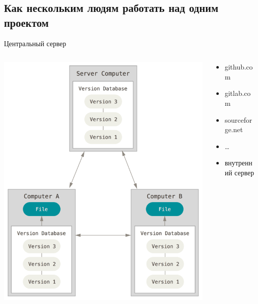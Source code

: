 \documentclass[presentation]{beamer}
\begin{document}
\subsection{Как нескольким людям работать над одним проектом}
\label{sec:orgd2f232c}
\begin{frame}[label={sec:orge85342b}]{Центральный сервер}
\begin{columns}
\begin{column}{0.65\columnwidth}
\begin{center}
\includegraphics[height=0.8\textheight]{./01_vcs_00_distributed_vcs.png}
\end{center}
\end{column}

\begin{column}{0.35\columnwidth}
\begin{itemize}
\item github.com
\item \alert{gitlab.com}
\item sourceforge.net
\item \ldots{}
\item внутренний сервер
\end{itemize}
\end{column}
\end{columns}
\end{frame}
\end{document}
